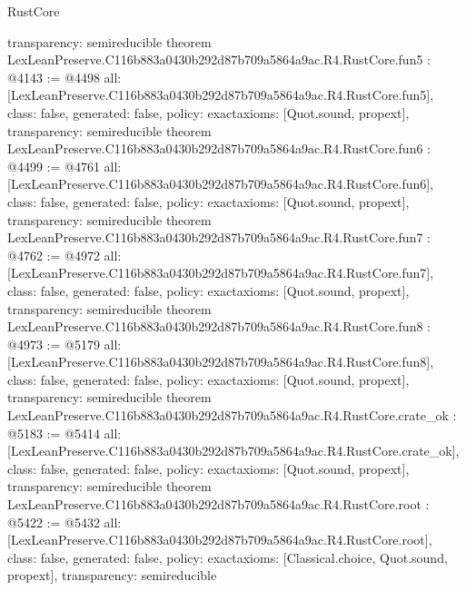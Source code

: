\begin{lexlean}{RustCore}
\begin{coremodule}
{  transparency: semireducible
}
theorem LexLeanPreserve.C116b883a0430b292d87b709a5864a9ac.R4.RustCore.fun5 : @4143 := @4498 {
  all: [LexLeanPreserve.C116b883a0430b292d87b709a5864a9ac.R4.RustCore.fun5],
  class: false,
  generated: false,
  policy: exact{axioms: [Quot.sound, propext]},
  transparency: semireducible
}
theorem LexLeanPreserve.C116b883a0430b292d87b709a5864a9ac.R4.RustCore.fun6 : @4499 := @4761 {
  all: [LexLeanPreserve.C116b883a0430b292d87b709a5864a9ac.R4.RustCore.fun6],
  class: false,
  generated: false,
  policy: exact{axioms: [Quot.sound, propext]},
  transparency: semireducible
}
theorem LexLeanPreserve.C116b883a0430b292d87b709a5864a9ac.R4.RustCore.fun7 : @4762 := @4972 {
  all: [LexLeanPreserve.C116b883a0430b292d87b709a5864a9ac.R4.RustCore.fun7],
  class: false,
  generated: false,
  policy: exact{axioms: [Quot.sound, propext]},
  transparency: semireducible
}
theorem LexLeanPreserve.C116b883a0430b292d87b709a5864a9ac.R4.RustCore.fun8 : @4973 := @5179 {
  all: [LexLeanPreserve.C116b883a0430b292d87b709a5864a9ac.R4.RustCore.fun8],
  class: false,
  generated: false,
  policy: exact{axioms: [Quot.sound, propext]},
  transparency: semireducible
}
theorem LexLeanPreserve.C116b883a0430b292d87b709a5864a9ac.R4.RustCore.crate_ok : @5183 := @5414 {
  all: [LexLeanPreserve.C116b883a0430b292d87b709a5864a9ac.R4.RustCore.crate_ok],
  class: false,
  generated: false,
  policy: exact{axioms: [Quot.sound, propext]},
  transparency: semireducible
}
theorem LexLeanPreserve.C116b883a0430b292d87b709a5864a9ac.R4.RustCore.root : @5422 := @5432 {
  all: [LexLeanPreserve.C116b883a0430b292d87b709a5864a9ac.R4.RustCore.root],
  class: false,
  generated: false,
  policy: exact{axioms: [Classical.choice, Quot.sound, propext]},
  transparency: semireducible
}


\end{coremodule}
\end{lexlean}

